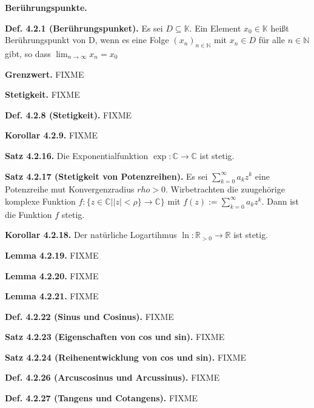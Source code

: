 \textbf{Berührungspunkte.}

\textbf{Def. 4.2.1 (Berührungspunket).} Es sei $D \subseteq \mathbb K$. Ein Element $x_0 \in \mathbb K$ heißt Berührungspunkt von D, wenn es eine Folge $(x_n)_{n \in \mathbb N}$ mit $x_n \in D$ für alle $n \in \mathbb N$ gibt, so dass $\lim_{n \rightarrow \infty} x_n = x_0$

\textbf{Grenzwert.} FIXME

\textbf{Stetigkeit.} FIXME

\textbf{Def. 4.2.8 (Stetigkeit).} FIXME

\textbf{Korollar 4.2.9.} FIXME

\textbf{Satz 4.2.16.} Die Exponentialfunktion $\exp :\mathbb C \rightarrow \mathbb C$ ist stetig.

\textbf{Satz 4.2.17 (Stetigkeit von Potenzreihen).} Es sei $\sum_{k=0}^\infty a_k z^k$ eine Potenzreihe mut Konvergenzradius $rho > 0$. Wirbetrachten die zuugehörige komplexe Funktion $f : \{ z \in \mathbb C \vert \vert z \vert < \rho \} \rightarrow \mathbb C\}$ mit $f(z) := \sum_{k=0}^\infty a_k z^k$. Dann ist die Funktion $f$ stetig.

\textbf{Korollar 4.2.18.} Der natürliche Logartihmus $\ln : \mathbb R_{>0} \rightarrow \mathbb R$ ist stetig.

\textbf{Lemma 4.2.19.} FIXME

\textbf{Lemma 4.2.20.} FIXME

\textbf{Lemma 4.2.21.} FIXME

\textbf{Def. 4.2.22 (Sinus und Cosinus).} FIXME

\textbf{Satz 4.2.23 (Eigenschaften von cos und sin).} FIXME

\textbf{Satz 4.2.24 (Reihenentwicklung von cos und sin).} FIXME

\textbf{Def. 4.2.26 (Arcuscosinus und Arcussinus).} FIXME

\textbf{Def. 4.2.27 (Tangens und Cotangens).} FIXME

